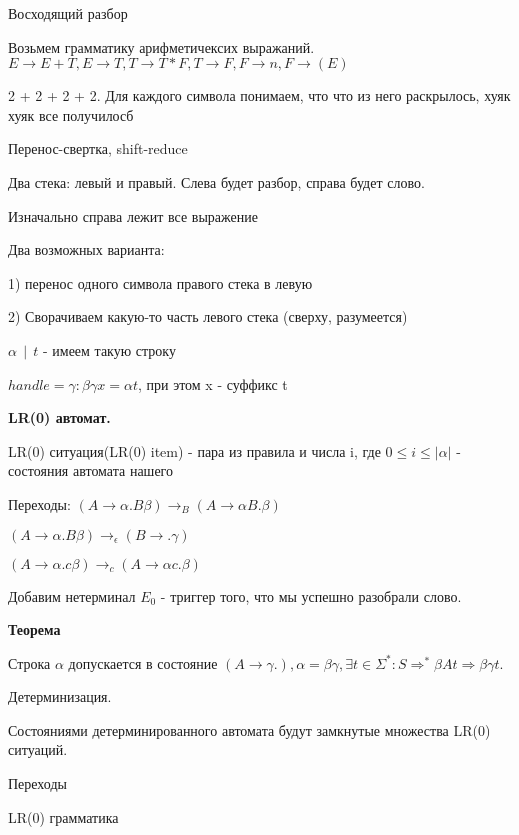 \begin{para}{Восходящий разбор}

Возьмем грамматику арифметичексих выражаний. $E \rightarrow E + T, E \rightarrow T, T \rightarrow T * F, T \rightarrow F, F \rightarrow n, F \rightarrow (E)$

2 + 2 + 2 + 2. Для каждого символа понимаем, что что из него раскрылось, хуяк хуяк все получилосб

\begin{defe}{Перенос-свертка, shift-reduce}

Два стека: левый и правый. Слева будет разбор, справа будет слово.

Изначально справа лежит все выражение

Два возможных варианта: 

1) перенос одного символа правого стека в левую

2) Сворачиваем какую-то часть левого стека (сверху, разумеется)

\end{defe}


$\alpha \: \: | \: \: t$ - имеем такую строку

$handle = \gamma : \beta \gamma x = \alpha t$, при этом x - суффикс t

\textbf{LR(0) автомат.}

LR(0) ситуация(LR(0) item) - пара из правила и числа i, где $0 \leq i \leq |\alpha|$ - состояния автомата нашего

Переходы: $(A \rightarrow \alpha . B \beta) \rightarrow_B (A \rightarrow \alpha B .\beta)$

$(A \rightarrow \alpha . B \beta) \rightarrow_\epsilon (B \rightarrow .\gamma)$

 $(A \rightarrow \alpha . c \beta) \rightarrow_c (A \rightarrow \alpha c .\beta)$
 
Добавим нетерминал $E_0$ - триггер того, что мы успешно разобрали слово.

\textbf{Теорема}

Строка $\alpha$ допускается в состояние $(A \rightarrow \gamma .), \alpha = \beta \gamma, \exists t \in \Sigma^* : S \Rightarrow^* \beta A t \Rightarrow \beta \gamma t.$

Детерминизация.

Состояниями детерминированного автомата будут замкнутые множества LR(0) ситуаций.

Переходы

\begin{defe}{LR(0) грамматика}


\end{defe}
\end{para}
